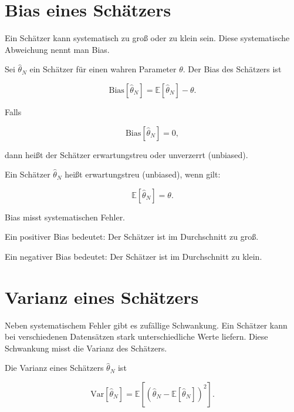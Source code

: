 \section{Bias eines Schätzers}

Ein Schätzer kann systematisch zu groß oder zu klein sein.
Diese systematische Abweichung nennt man Bias.

\begin{definitionbox}
Sei \(\hat{\theta}_N\) ein Schätzer für einen wahren Parameter \(\theta\).
Der Bias des Schätzers ist

\[
    \mathrm{Bias}[\hat{\theta}_N]
    =
    \mathbb{E}[\hat{\theta}_N] - \theta.
\]
\end{definitionbox}

Falls

\[
    \mathrm{Bias}[\hat{\theta}_N] = 0,
\]

dann heißt der Schätzer erwartungstreu oder unverzerrt (unbiased).

\begin{definitionbox}
Ein Schätzer \(\hat{\theta}_N\) heißt erwartungstreu (unbiased), wenn gilt:

\[
    \mathbb{E}[\hat{\theta}_N] = \theta.
\]
\end{definitionbox}

\begin{conceptbox}
Bias misst systematischen Fehler.

Ein positiver Bias bedeutet:
Der Schätzer ist im Durchschnitt zu groß.

Ein negativer Bias bedeutet:
Der Schätzer ist im Durchschnitt zu klein.
\end{conceptbox}

\section{Varianz eines Schätzers}

Neben systematischem Fehler gibt es zufällige Schwankung.
Ein Schätzer kann bei verschiedenen Datensätzen stark unterschiedliche Werte liefern.
Diese Schwankung misst die Varianz des Schätzers.

\begin{definitionbox}
Die Varianz eines Schätzers \(\hat{\theta}_N\) ist

\[
    \mathrm{Var}[\hat{\theta}_N]
    =
    \mathbb{E}\left[
        \left(
            \hat{\theta}_N
            -
            \mathbb{E}[\hat{\theta}_N]
        \right)^2
    \right].
\]
\end{definitionbox}

